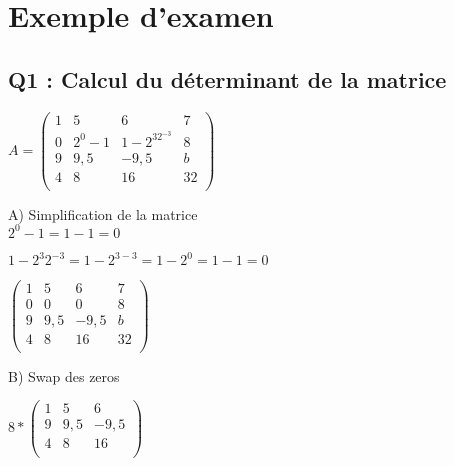 
\newpage
\chapter{Exemple d'examen}
\vspace{10mm} %
\section{Q1 : Calcul du déterminant de la matrice}

\vspace{10mm} %

$
A =
\begin{pmatrix}
  1 & 5 & 6 & 7 \\
  0 & 2^0-1 & 1-2^32^{-3} & 8 \\
  9 & 9,5 & -9,5 & b \\
  4 & 8 & 16 & 32 \\
\end{pmatrix}
$

\vspace{10mm} %

A) Simplification de la matrice \\

\vspace{2mm} %
$2^{0}-1 = 1-1 = 0$
\vspace{2mm} %

$1-2^{3} 2^{-3} = 1-2^{3-3} = 1-2^{0} = 1-1 = 0$
\vspace{4mm} %

$
\begin{pmatrix}
  1 & 5 & 6 & 7 \\
  0 & 0 & 0 & 8 \\
  9 & 9,5 & -9,5 & b \\
  4 & 8 & 16 & 32 \\
\end{pmatrix}
$

\vspace{10mm} %

B) Swap des zeros\\

\vspace{5mm} %

$
8*
\begin{pmatrix}
  1 & 5 & 6 \\
  9 & 9,5 & {-9,5} \\
  4 & 8 & 16 \\
\end{pmatrix}
$

